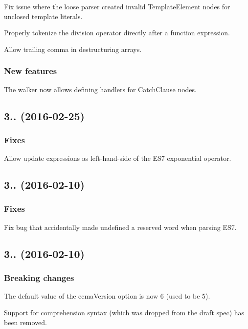 Fix issue where the loose parser created invalid Template\+Element nodes for unclosed template literals.

Properly tokenize the division operator directly after a function expression.

Allow trailing comma in destructuring arrays.

\subsubsection*{New features}

The walker now allows defining handlers for {\ttfamily Catch\+Clause} nodes.

\subsection*{3.. (2016-\/02-\/25)}

\subsubsection*{Fixes}

Allow update expressions as left-\/hand-\/side of the E\+S7 exponential operator.

\subsection*{3.. (2016-\/02-\/10)}

\subsubsection*{Fixes}

Fix bug that accidentally made {\ttfamily undefined} a reserved word when parsing E\+S7.

\subsection*{3.. (2016-\/02-\/10)}

\subsubsection*{Breaking changes}

The default value of the {\ttfamily ecma\+Version} option is now 6 (used to be 5).

Support for comprehension syntax (which was dropped from the draft spec) has been removed.


